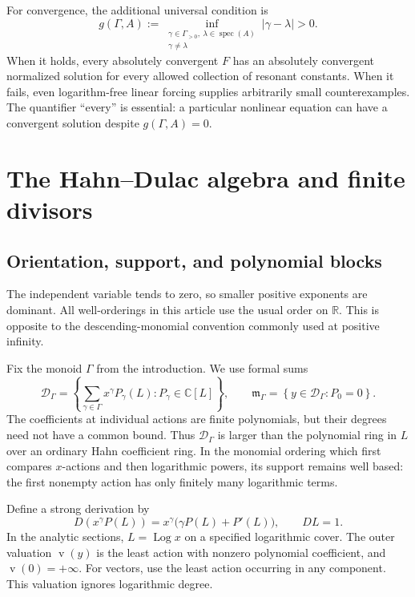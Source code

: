 \documentclass[11pt,a4paper]{article}
\numberwithin{equation}{section}
\theoremstyle{definition}
\theoremstyle{remark}
\newcommand{\CC}{\mathbb C}
\newcommand{\RR}{\mathbb R}
\newcommand{\G}{\Gamma}
\newcommand{\val}{\operatorname{v}}
\newcommand{\spec}{\operatorname{spec}}
\newcommand{\abs}[1]{\left\lvert #1\right\rvert}
\newcommand{\Log}{\operatorname{Log}}
\begin{document}
For convergence, the additional universal condition is
\begin{equation}\label{eq:gap-intro}
 g(\G,A):=
 \inf_{\substack{\gamma\in\G_{>0},\ \lambda\in\spec(A)\\
                  \gamma\ne\lambda}}
 \abs{\gamma-\lambda}>0.
\end{equation}
When it holds, every absolutely convergent \(F\) has an absolutely
convergent normalized solution for every allowed collection of resonant
constants. When it fails, even logarithm-free linear forcing supplies
arbitrarily small counterexamples. The quantifier ``every'' is essential:
a particular nonlinear equation can have a convergent solution despite
\(g(\G,A)=0\).

\section{The Hahn--Dulac algebra and finite divisors}
\label{sec:support}

\subsection{Orientation, support, and polynomial blocks}
The independent variable tends to zero, so smaller positive exponents
are dominant. All well-orderings in this article use the usual order on
\(\RR\). This is opposite to the descending-monomial convention commonly
used at positive infinity.

Fix the monoid \(\G\) from the introduction. We use formal sums
\begin{equation}\label{eq:log-hahn}
 \mathscr D_\G=
 \left\{\sum_{\gamma\in\G}x^\gamma P_\gamma(L):
                  P_\gamma\in\CC[L]\right\},
 \qquad
 \mathfrak m_\G=
 \left\{y\in\mathscr D_\G:P_0=0\right\}.
\end{equation}
The coefficients at individual actions are finite polynomials, but their
degrees need not have a common bound. Thus \(\mathscr D_\G\) is larger
than the polynomial ring in \(L\) over an ordinary Hahn coefficient
ring. In the monomial ordering which first compares \(x\)-actions and
then logarithmic powers, its support remains well based: the first
nonempty action has only finitely many logarithmic terms.

Define a strong derivation by
\begin{equation}\label{eq:derivation}
 D(x^\gamma P(L))=x^\gamma\bigl(\gamma P(L)+P'(L)\bigr),
 \qquad DL=1.
\end{equation}
In the analytic sections, \(L=\Log x\) on a specified logarithmic cover.
The outer valuation \(\val(y)\) is the least action with nonzero
polynomial coefficient, and \(\val(0)=+\infty\). For vectors, use the
least action occurring in any component. This valuation ignores
logarithmic degree.
\end{document}
